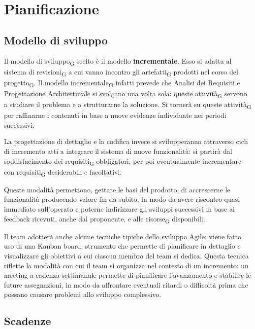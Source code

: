 \section{Pianificazione}

\subsection{Modello di sviluppo}

Il modello di sviluppo\textsubscript{G} scelto è il modello \textbf{incrementale}. Esso si adatta al sistema di revisioni\textsubscript{G} a cui vanno incontro gli artefatti\textsubscript{G} prodotti nel corso del progetto\textsubscript{G}. Il modello incrementale\textsubscript{G} infatti prevede che Analisi dei Requisiti e Progettazione Architetturale si svolgano una volta sola: queste attività\textsubscript{G} servono a studiare il problema e a strutturarne la soluzione. Si tornerà su queste attività\textsubscript{G} per raffinarne i contenuti in base a nuove evidenze individuate nei periodi successivi.

La progettazione di dettaglio e la codifica invece si svilupperanno attraverso cicli di incremento atti a integrare il sistema di nuove funzionalità: si partirà dal soddisfacimento dei requisiti\textsubscript{G} obbligatori, per poi eventualmente incrementare con requisiti\textsubscript{G} desiderabili e facoltativi.

Queste modalità permettono, gettate le basi del prodotto, di accrescerne le funzionalità producendo valore fin da subito, in modo da avere riscontro quasi immediato sull'operato e poterne indirizzare gli sviluppi successivi in base ai feedback ricevuti, anche dal proponente, e alle risorse\textsubscript{G} disponibili.

Il team adotterà anche alcune tecniche tipiche dello sviluppo Agile: viene fatto uso di una Kanban board, strumento che permette di pianificare in dettaglio e visualizzare gli obiettivi a cui ciascun membro del team si dedica. Questa tecnica riflette la modalità con cui il team si organizza nel contesto di un incremento: un meeting a cadenza settimanale permette di pianificare l'avanzamento e stabilire le future assegnazioni, in modo da affrontare eventuali ritardi o difficoltà prima che possano causare problemi allo sviluppo complessivo.



\subsection{Scadenze}

